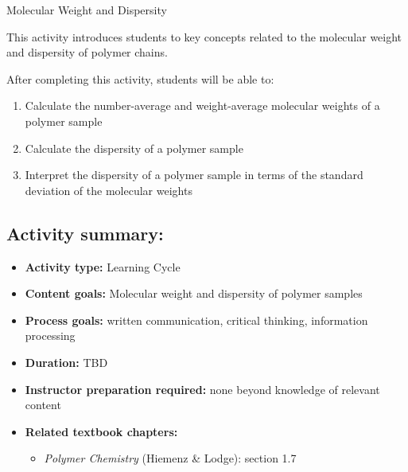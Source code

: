 %
%
%
%

\renewcommand{\figpath}{content/intro/M-and-D/figs}
\renewcommand{\labelbase}{M-and-D}

\begin{activity}{Molecular Weight and Dispersity}

\begin{instructornotes}

	This activity introduces students to key concepts related to the molecular weight and dispersity of polymer chains.
	
	After completing this activity, students will be able to:
			\begin{enumerate}
				\item Calculate the number-average and weight-average molecular weights of a polymer sample
				\item Calculate the dispersity of a polymer sample
				\item Interpret the dispersity of a polymer sample in terms of the standard deviation of the molecular weights
			\end{enumerate}
			
	\subsection*{Activity summary:}
	\begin{itemize}
		\item \textbf{Activity type:} Learning Cycle
		\item \textbf{Content goals:} Molecular weight and dispersity of polymer samples
		\item \textbf{Process goals:} %
			written communication, critical thinking, information processing
		\item \textbf{Duration:} TBD
		\item \textbf{Instructor preparation required:} none beyond knowledge of relevant content
		\item \textbf{Related textbook chapters:}
			\begin{itemize}
				\item \emph{Polymer Chemistry} (Hiemenz \& Lodge): section 1.7
			\end{itemize}
	\end{itemize}


\end{instructornotes}
\end{activity}
